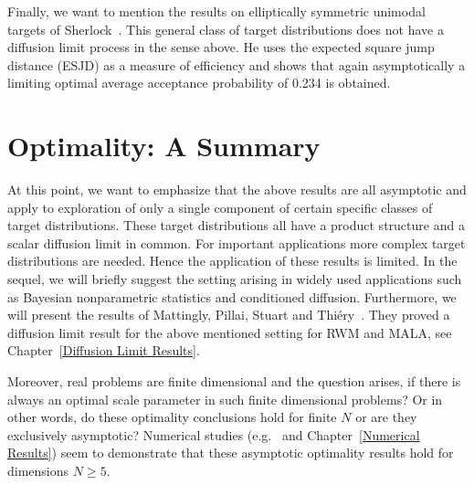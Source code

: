 Finally, we want to mention the results on elliptically symmetric unimodal targets of Sherlock~\autocite{Sherlock2006}. This general class of target distributions does not have a diffusion limit process in the sense above. He uses the expected square jump distance (ESJD) as a measure of efficiency and shows that again asymptotically a limiting optimal average acceptance probability of 0.234 is obtained.



\section{Optimality: A Summary}

At this point, we want to emphasize that the above results are all asymptotic and apply to exploration of only a single component of certain specific classes of target distributions. These target distributions  all have a product structure and a scalar diffusion limit in common. For important applications  more complex target distributions are needed. Hence the application of these results is limited. In the sequel, we will briefly suggest the setting arising in widely used applications such as Bayesian nonparametric statistics and conditioned diffusion. Furthermore, we will present the results of Mattingly, Pillai, Stuart and Thi\'{e}ry~\autocite{Mattingly2010, Pillai2012}. They proved a diffusion limit result for the above mentioned setting for RWM and MALA, see Chapter~\ref{Diffusion Limit Results}.

Moreover, real problems are finite dimensional and the question arises, if there is always an optimal scale parameter in such finite dimensional problems? Or in other words, do these optimality conclusions hold for finite $N$ or are they exclusively asymptotic? Numerical studies (e.g.~\autocite{Gelman1996, Roberts2001} and Chapter~\ref{Numerical Results}) seem to demonstrate that these asymptotic optimality results hold for dimensions $N \geq 5 $. 






